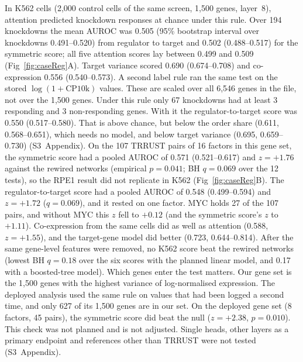 \documentclass[10pt,letterpaper]{article}
\begin{document}
In K562 cells (2,000 control cells of the same screen, 1,500 genes,
layer~8), attention predicted knockdown responses at chance under this
rule. Over 194 knockdowns the mean AUROC was 0.505 (95\%
bootstrap interval over knockdowns 0.491--0.520) from regulator to target
and 0.502 (0.488--0.517) for the symmetric score; all five attention
scores lay between 0.499 and 0.509 (Fig~\ref{fig:caseReg}A). Target
variance scored 0.690 (0.674--0.708) and co-expression 0.556
(0.540--0.573). A second label rule ran the same test on the stored
$\log(1+\text{CP10k})$ values. These are scaled over all 6,546 genes in
the file, not over the 1,500 genes. Under this rule only 67 knockdowns
had at least 3 responding and 3 non-responding genes. With it
the regulator-to-target score was 0.550 (0.517--0.580). That is above
chance, but below the order share (0.611, 0.568--0.651), which needs no
model, and below target variance (0.695, 0.659--0.730) (S3~Appendix).
On the 107 TRRUST pairs of 16 factors in this gene set, the symmetric
score had a pooled AUROC of 0.571 (0.521--0.617) and $z = +1.76$ against
the rewired networks (empirical $p = 0.041$; BH $q = 0.069$ over the 12
tests), so the RPE1 result did not replicate in K562
(Fig~\ref{fig:caseReg}B). The regulator-to-target score had a pooled
AUROC of 0.548 (0.499--0.594) and $z = +1.72$ ($q = 0.069$), and it
rested on one factor. MYC holds 27 of the 107 pairs, and without MYC
this $z$ fell to $+0.12$ (and the symmetric score's $z$ to $+1.11$).
Co-expression from the same cells did as well as attention (0.588,
$z = +1.55$), and the target-gene model did better (0.723,
0.644--0.814). After the same gene-level features were removed, no K562
score beat the rewired networks (lowest BH $q = 0.18$ over the six
scores with the planned linear model, and 0.17 with a boosted-tree
model). Which genes enter the test matters. Our gene set is the 1,500
genes with the highest variance of log-normalised expression. The
deployed analysis used the same rule on values that had been logged a
second time, and only 627 of its 1,500 genes are in our set. On the
deployed gene set (8 factors, 45 pairs), the symmetric score did beat
the null ($z = +2.38$, $p = 0.010$). This check was not planned and is
not adjusted. Single heads, other layers as a primary endpoint and
references other than TRRUST were not tested (S3~Appendix).
\end{document}
